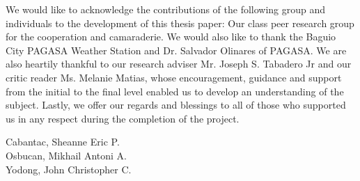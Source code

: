 We would like to acknowledge the contributions of the following group and individuals to the development of this thesis paper: 
Our class peer research group for the cooperation and camaraderie. We would also like to thank the Baguio City PAGASA Weather Station and Dr. Salvador Olinares of PAGASA. We are also heartily thankful to our research adviser Mr. Joseph S. Tabadero Jr and our critic reader Ms. Melanie Matias, whose encouragement, guidance and support from the initial to the final level enabled us to develop an understanding of the subject. 
Lastly, we offer our regards and blessings to all of those who supported us in any respect during the completion of the project. 
\begin{flushright}
Cabantac, Sheanne Eric P.\\
Osbucan, Mikhail Antoni A.\\
Yodong, John Christopher C.
\end{flushright}
